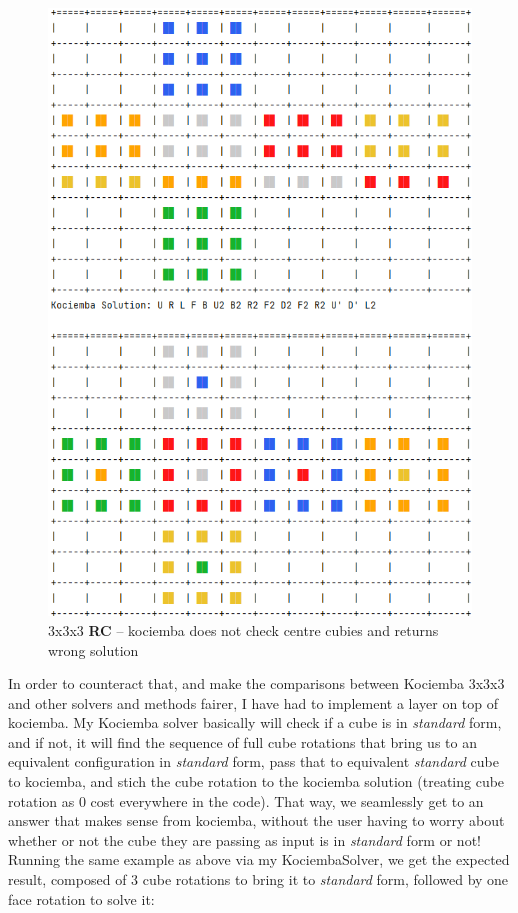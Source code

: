 \begin{figure}[H]
\centering
\includegraphics[scale=0.6]{./Figures/KociembaBug333}
\caption[Kociemba Bug]{3x3x3 \textbf{RC} -- kociemba does not check centre cubies and returns wrong solution}
\label{fig:KociembaBug333}
\end{figure}
In order to counteract that, and make the comparisons between Kociemba 3x3x3 and other solvers and methods fairer, I have had to implement a layer on top of kociemba. My Kociemba solver basically will check if a cube is in \textit{standard} form, and if not, it will find the sequence of full cube rotations that bring us to an equivalent configuration in \textit{standard} form, pass that to equivalent \textit{standard} cube to kociemba, and stich the cube rotation to the kociemba solution (treating cube rotation as 0 cost everywhere in the code). That way, we seamlessly get to an answer that makes sense from kociemba, without the user having to worry about whether or not the cube they are passing as input is in \textit{standard} form or not! Running the same example as above via my KociembaSolver, we get the expected result, composed of 3 cube rotations to bring it to \textit{standard} form, followed by one face rotation to solve it:

